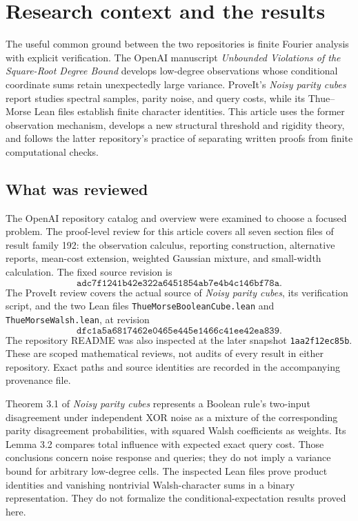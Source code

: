 \section{Research context and the results}
\label{sec:context}

The useful common ground between the two repositories is finite Fourier
analysis with explicit verification. The OpenAI manuscript
\emph{Unbounded Violations of the Square-Root Degree Bound}
\cite{OpenAI2026} develops low-degree observations whose conditional
coordinate sums retain unexpectedly large variance. ProveIt's
\emph{Noisy parity cubes} report \cite{ProveItNoise} studies spectral
samples, parity noise, and query costs, while its Thue--Morse Lean files
\cite{ProveItWalsh} establish finite character identities. This article
uses the former observation mechanism, develops a new structural
threshold and rigidity theory, and follows the latter repository's
practice of separating written proofs from finite computational checks.

\subsection{What was reviewed}

The OpenAI repository catalog and overview were examined to choose a
focused problem. The proof-level review for this article covers all seven
section files of result family 192: the observation calculus, reporting
construction, alternative reports, mean-cost extension, weighted
Gaussian mixture, and small-width calculation. The fixed source revision
is
\[
\texttt{adc7f1241b42e322a6451854ab7e4b4c146bf78a}.
\]
The ProveIt review covers the actual source of \emph{Noisy parity cubes},
its verification script, and the two Lean files
\texttt{ThueMorseBooleanCube.lean} and \texttt{ThueMorseWalsh.lean}, at
revision
\[
\texttt{dfc1a5a6817462e0465e445e1466c41ee42ea839}.
\]
The repository README was also inspected at the later snapshot
\texttt{1aa2f12ec85b}.
These are scoped mathematical reviews, not audits of every result in
either repository. Exact paths and source identities are recorded in the
accompanying provenance file.

Theorem 3.1 of \emph{Noisy parity cubes} represents a Boolean rule's
two-input disagreement under independent XOR noise as a mixture of the
corresponding parity disagreement probabilities, with squared Walsh
coefficients as weights. Its Lemma 3.2 compares total influence with
expected exact query cost. Those conclusions concern noise response and
queries; they do not imply a variance bound for arbitrary low-degree
cells. The inspected Lean files prove product identities and vanishing
nontrivial Walsh-character sums in a binary representation. They do not formalize the
conditional-expectation results proved here.

